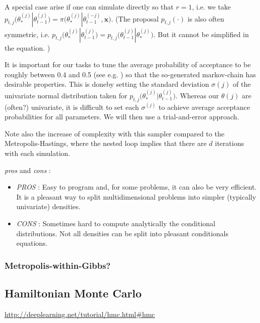 A special case arise if one can simulate directly so that $r=1$, i.e. we take $p_{t,j}\big(\theta_*^{(j)}|\theta_{t-1}^{(j)}\big)=\pi\big(\theta_*^{(j)}|\theta_{t-1}^{(-j)},\boldsymbol{x}\big)$.
(The proposal $p_{t,j}(\cdot)$ is also often symmetric, i.e.
$p_{t,j}\big(\theta_*^{(j)}|\theta_{t-1}^{(j)}\big)= p_{t,j}\big(\theta_{t-1}^{(j)}|\theta_*^{(j)}\big)$. But it cannot be simplified in the equation. )

It is important for our tasks to tune the average probability of acceptance to be roughly between 0.4 and 0.5 (see e.g. \citet[chapter 11]{gelman_bayesian_2013} ) so that the so-generated markov-chain has desirable properties. This is doneby setting the standard deviation $\sigma{(j)}$ of the univariate normal distribution taken for $p_{t,j}\big(\theta_*^{(j)}|\theta_{t-1}^{(j)}\big)$. Whereas our $\theta{(j)}$ are (often?) univariate, it is difficult to set each $\sigma^{(j)}$ to achieve average acceptance probabilities for all parameters. We will then use a trial-and-error approach.

Note also the increase of complexity with this sampler compared to the Metropolis-Hastings, where the nested loop implies that there are $d$ iterations with each simulation.


\emph{pros} and \emph{cons} : 

\begin{itemize}
	\item \emph{PROS} : Easy to program and, for some problems, it can also be very efficient. It is a pleasant way to split multidimensional problems into simpler (typically univariate) densities.
	\item \emph{CONS} : Sometimes hard to compute analytically the conditional distributions. Not all densities can be split into pleasant conditionals equations.
\end{itemize}



\subsubsection*{Metropolis-within-Gibbs?}



\subsection{Hamiltonian Monte Carlo}

\url{http://deeplearning.net/tutorial/hmc.html#hmc} \\

